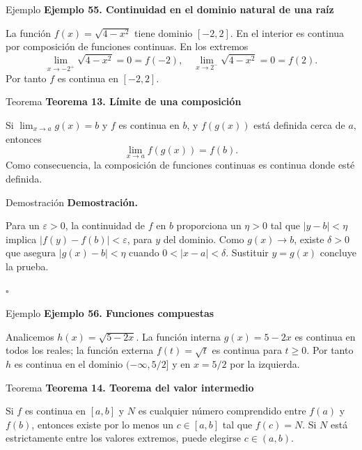 \documentclass[12pt,aspectratio=169]{beamer}
\begin{document}
\begin{frame}[t,allowframebreaks]{Ejemplo}
{\color{azul}\bfseries Ejemplo 55. Continuidad en el dominio natural de una raíz}\par\medskip

La función $f(x)=\sqrt{4-x^2}$ tiene dominio $[-2,2]$. En el interior es continua por composición de funciones continuas. En los extremos
\[
 \lim_{x\to-2^+}\sqrt{4-x^2}=0=f(-2),\quad
 \lim_{x\to2^-}\sqrt{4-x^2}=0=f(2).
\]
Por tanto $f$ es continua en $[-2,2]$.
\end{frame}


\begin{frame}[t,allowframebreaks]{Teorema}
{\color{azul}\bfseries Teorema 13. Límite de una composición}\par\medskip

Si $\lim_{x\to a}g(x)=b$ y $f$ es continua en $b$, y $f(g(x))$ está definida cerca de $a$, entonces
\[
 \lim_{x\to a}f(g(x))=f(b).
\]
Como consecuencia, la composición de funciones continuas es continua donde esté definida.
\end{frame}


\begin{frame}[t,allowframebreaks]{Demostración}
{\color{azul}\bfseries Demostración.}\par\smallskip

Para un $\varepsilon>0$, la continuidad de $f$ en $b$ proporciona un $\eta>0$ tal que $|y-b|<\eta$ implica $|f(y)-f(b)|<\varepsilon$, para $y$ del dominio. Como $g(x)\to b$, existe $\delta>0$ que asegura $|g(x)-b|<\eta$ cuando $0<|x-a|<\delta$. Sustituir $y=g(x)$ concluye la prueba.

\hfill $\square$
\end{frame}


\begin{frame}[t,allowframebreaks]{Ejemplo}
{\color{azul}\bfseries Ejemplo 56. Funciones compuestas}\par\medskip

Analicemos $h(x)=\sqrt{5-2x}$. La función interna $g(x)=5-2x$ es continua en todos los reales; la función externa $f(t)=\sqrt t$ es continua para $t\ge0$. Por tanto $h$ es continua en el dominio $(-\infty,5/2]$ y en $x=5/2$ por la izquierda.
\end{frame}


\begin{frame}[t,allowframebreaks]{Teorema}
{\color{azul}\bfseries Teorema 14. Teorema del valor intermedio}\par\medskip

Si $f$ es continua en $[a,b]$ y $N$ es cualquier número comprendido entre $f(a)$ y $f(b)$, entonces existe por lo menos un $c\in[a,b]$ tal que $f(c)=N$. Si $N$ está estrictamente entre los valores extremos, puede elegirse $c\in(a,b)$.
\end{frame}
\end{document}
